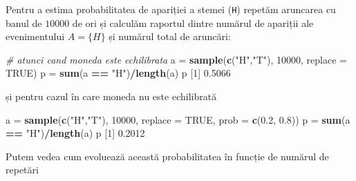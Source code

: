 \documentclass[]{article}
\newenvironment{Shaded}{\begin{snugshade}}{\end{snugshade}}
\newcommand{\CommentTok}[1]{\textcolor[rgb]{0.56,0.35,0.01}{\textit{#1}}}
\newcommand{\DataTypeTok}[1]{\textcolor[rgb]{0.13,0.29,0.53}{#1}}
\newcommand{\DecValTok}[1]{\textcolor[rgb]{0.00,0.00,0.81}{#1}}
\newcommand{\FloatTok}[1]{\textcolor[rgb]{0.00,0.00,0.81}{#1}}
\newcommand{\KeywordTok}[1]{\textcolor[rgb]{0.13,0.29,0.53}{\textbf{#1}}}
\newcommand{\NormalTok}[1]{#1}
\newcommand{\OperatorTok}[1]{\textcolor[rgb]{0.81,0.36,0.00}{\textbf{#1}}}
\newcommand{\OtherTok}[1]{\textcolor[rgb]{0.56,0.35,0.01}{#1}}
\newcommand{\StringTok}[1]{\textcolor[rgb]{0.31,0.60,0.02}{#1}}
\begin{document}
Pentru a estima probabilitatea de apariției a stemei (\texttt{H})
repetăm aruncarea cu banul de \(10000\) de ori și calculăm raportul
dintre numărul de apariții ale evenimentului \(A=\{H\}\) și numărul
total de aruncări:

\begin{Shaded}
\begin{Highlighting}[]
\CommentTok{# atunci cand moneda este echilibrata}
\NormalTok{a =}\StringTok{ }\KeywordTok{sample}\NormalTok{(}\KeywordTok{c}\NormalTok{(}\StringTok{"H"}\NormalTok{,}\StringTok{"T"}\NormalTok{), }\DecValTok{10000}\NormalTok{, }\DataTypeTok{replace =} \OtherTok{TRUE}\NormalTok{)}
\NormalTok{p =}\StringTok{ }\KeywordTok{sum}\NormalTok{(a }\OperatorTok{==}\StringTok{ "H"}\NormalTok{)}\OperatorTok{/}\KeywordTok{length}\NormalTok{(a)}
\NormalTok{p}
\NormalTok{[}\DecValTok{1}\NormalTok{] }\FloatTok{0.5066}
\end{Highlighting}
\end{Shaded}

și pentru cazul în care moneda nu este echilibrată

\begin{Shaded}
\begin{Highlighting}[]
\NormalTok{a =}\StringTok{ }\KeywordTok{sample}\NormalTok{(}\KeywordTok{c}\NormalTok{(}\StringTok{"H"}\NormalTok{,}\StringTok{"T"}\NormalTok{), }\DecValTok{10000}\NormalTok{, }\DataTypeTok{replace =} \OtherTok{TRUE}\NormalTok{, }\DataTypeTok{prob =} \KeywordTok{c}\NormalTok{(}\FloatTok{0.2}\NormalTok{, }\FloatTok{0.8}\NormalTok{))}
\NormalTok{p =}\StringTok{ }\KeywordTok{sum}\NormalTok{(a }\OperatorTok{==}\StringTok{ "H"}\NormalTok{)}\OperatorTok{/}\KeywordTok{length}\NormalTok{(a)}
\NormalTok{p}
\NormalTok{[}\DecValTok{1}\NormalTok{] }\FloatTok{0.2012}
\end{Highlighting}
\end{Shaded}

Putem vedea cum evoluează această probabilitatea în funcție de numărul
de repetări
\end{document}
